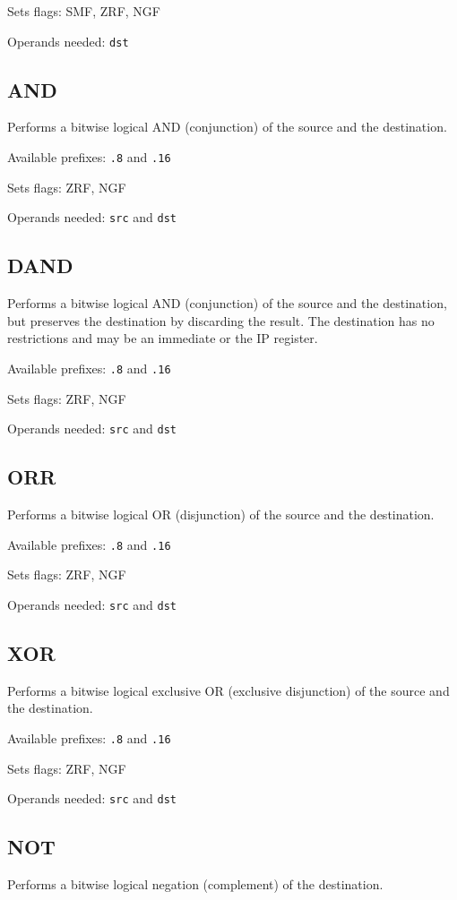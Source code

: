 \documentclass[12pt,a4paper]{report}
\begin{document}
Sets flags: SMF, ZRF, NGF

Operands needed: \texttt{dst}

\subsection*{AND}
Performs a bitwise logical AND (conjunction) of the source and the destination.

Available prefixes: \texttt{.8} and \texttt{.16}

Sets flags: ZRF, NGF

Operands needed: \texttt{src} and \texttt{dst}

\subsection*{DAND}
Performs a bitwise logical AND (conjunction) of the source and the destination, but preserves the destination by discarding the result. The destination has no restrictions and may be an immediate or the IP register.

Available prefixes: \texttt{.8} and \texttt{.16}

Sets flags: ZRF, NGF

Operands needed: \texttt{src} and \texttt{dst}

\subsection*{ORR}
Performs a bitwise logical OR (disjunction) of the source and the destination.

Available prefixes: \texttt{.8} and \texttt{.16}

Sets flags: ZRF, NGF

Operands needed: \texttt{src} and \texttt{dst}

\subsection*{XOR}
Performs a bitwise logical exclusive OR (exclusive disjunction) of the source and the destination.

Available prefixes: \texttt{.8} and \texttt{.16}

Sets flags: ZRF, NGF

Operands needed: \texttt{src} and \texttt{dst}

\subsection*{NOT}
Performs a bitwise logical negation (complement) of the destination.
\end{document}
